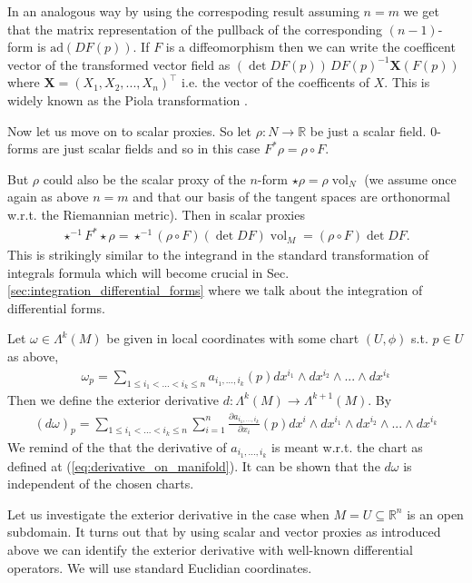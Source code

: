 \documentclass[12pt,a4paper]{article}
\numberwithin{equation}{subsection}
\numberwithin{lemma}{subsection}
\theoremstyle{definition}
\DeclareMathOperator{\vol}{vol}
\newcommand{\real}{\mathbb{R}}
\begin{document}
In an analogous way by using the correspoding result assuming $n = m$ 
we get that the 
matrix representation of the pullback of the corresponding $(n-1)$-form 
is $\text{ad}(DF(p))$. If $F$ is a diffeomorphism then we can write the
coefficent vector of the transformed vector field as 
$(\det DF(p)) \, DF(p)^{-1} \mathbf{X}(F(p))$ where 
$\mathbf{X} = (X_1, X_2, ..., X_n)^\top$ i.e. the vector of the coefficents 
of $X$. This is widely known as the Piola transformation \cite{Ern Guermond}.

Now let us move on to scalar proxies. So let $\rho: N \rightarrow \real$ be 
just a scalar field. $0$-forms are just scalar fields and so 
in this case $F^* \rho = \rho \circ F$. 

But $\rho$ could also be the scalar proxy of the $n$-form 
$\star \rho = \rho \vol_N$ (we assume once again 
as above
$n=m$ and that our basis of the tangent spaces are orthonormal w.r.t. the 
Riemannian metric). Then in scalar proxies 
\begin{align*}
    \star ^{-1}F^* \star \rho = \star^{-1} (\rho \circ F) (\det DF) \vol_M
        = (\rho \circ F) \det DF.
\end{align*}
This is strikingly similar to the integrand in the standard transformation 
of integrals formula which will become crucial in  
Sec.\,\ref{sec:integration_differential_forms} where we talk about the
integration of differential forms.

Let $\omega \in \Lambda^k (M)$ be given 
in local coordinates with some chart $(U,\phi)$ s.t. $p\in U$ as above,
\begin{align*}
    \omega_p = \sum\limits_{1\leq i_1 < ... < i_k \leq n} 
        a_{i_1,...,i_k}(p) dx^{i_1} \wedge dx^{i_2} \wedge ... \wedge dx^{i_k}
\end{align*}
Then we define the exterior derivative $d: \Lambda^{k}(M) \rightarrow 
\Lambda^{k+1}(M)$. By
\begin{align*}
    (d\omega)_p = \sum\limits_{1\leq i_1 < ... < i_k \leq n} \sum\limits_{i=1}^n
    \frac{\partial a_{i_1,...,i_k}}{\partial x_i}(p) 
    dx^i \wedge dx^{i_1} \wedge dx^{i_2} \wedge ... \wedge dx^{i_k}
\end{align*}
We remind of the that the derivative of $a_{i_1,...,i_k}$ is meant w.r.t. 
the chart as defined at (\ref{eq:derivative_on_manifold}).
It can be shown that the $d\omega$ is independent of the chosen charts. 

Let us investigate the exterior derivative in the case when 
$M = U \subseteq \real^n$ is an open subdomain. It turns out that by using 
scalar and vector proxies as introduced above we can identify the exterior 
derivative with well-known differential operators. We will use standard 
Euclidian coordinates. 
\end{document}
